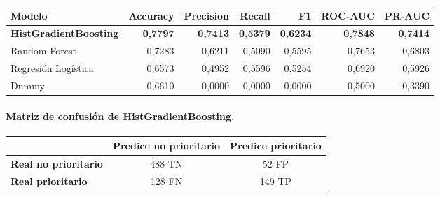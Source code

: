 \documentclass[11pt,a4paper]{article}
\begin{document}
\begin{table}[H]
\centering
\small
\begin{tabular}{@{}l r r r r r r@{}}
\toprule
\textbf{Modelo} & \textbf{Accuracy} & \textbf{Precision} & \textbf{Recall} & \textbf{F1} & \textbf{ROC-AUC} & \textbf{PR-AUC} \\
\midrule
\textbf{HistGradientBoosting} & \textbf{0,7797} & \textbf{0,7413} & \textbf{0,5379} & \textbf{0,6234} & \textbf{0,7848} & \textbf{0,7414} \\
Random Forest & 0,7283 & 0,6211 & 0,5090 & 0,5595 & 0,7653 & 0,6803 \\
Regresión Logística & 0,6573 & 0,4952 & 0,5596 & 0,5254 & 0,6920 & 0,5926 \\
Dummy & 0,6610 & 0,0000 & 0,0000 & 0,0000 & 0,5000 & 0,3390 \\
\bottomrule
\end{tabular}
\end{table}

\paragraph{Matriz de confusión de HistGradientBoosting.}

\begin{table}[H]
\centering
\small
\begin{tabular}{@{}l c c@{}}
\toprule
 & \textbf{Predice no prioritario} & \textbf{Predice prioritario} \\
\midrule
\textbf{Real no prioritario} & 488 TN & 52 FP \\
\textbf{Real prioritario} & 128 FN & 149 TP \\
\bottomrule
\end{tabular}
\end{table}
\end{document}
